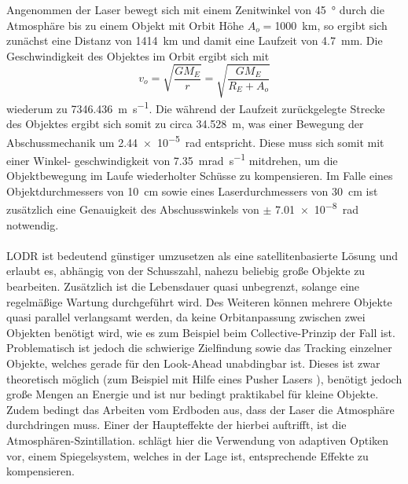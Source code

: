 \documentclass{article}
\begin{document}
Angenommen der Laser bewegt sich mit einem Zenitwinkel von \SI{45}{\degree} durch die Atmosphäre bis zu einem Objekt mit Orbit Höhe $A_o = $\SI{1000}{\kilo\meter}, so ergibt sich zunächst eine Distanz von \SI{1414}{\kilo\meter} und damit eine Laufzeit von \SI{4.7}{\milli \meter}. Die Geschwindigkeit des Objektes im Orbit ergibt sich mit 
\begin{equation}
	\label{objspeed}
	v_o=\sqrt{\frac{GM_E}{r}}=\sqrt{\frac{GM_E}{R_E+A_o}}
\end{equation}
\noindent
wiederum zu \SI{7346.436}{\meter \per \second}.
Die während der Laufzeit zurückgelegte Strecke des Objektes ergibt sich somit zu circa \SI{34.528}{\meter}, was einer Bewegung der Abschussmechanik um  \SI{2.44e-5}{\radian} entspricht. Diese muss sich somit mit einer Winkel- geschwindigkeit von \SI{7.35}{\milli \radian \per \second} mitdrehen, um die Objektbewegung im Laufe wiederholter Schüsse zu kompensieren. Im Falle eines Objektdurchmessers von \SI{10}{\centi \meter} sowie eines Laserdurchmessers von \SI{30}{\centi \meter} ist zusätzlich eine Genauigkeit des Abschusswinkels von $\pm$ \SI{7.01e-8}{\radian} notwendig.\\\\
LODR ist bedeutend günstiger umzusetzen als eine satellitenbasierte Lösung und erlaubt es, abhängig von der Schusszahl, nahezu beliebig große Objekte zu bearbeiten. Zusätzlich ist die Lebensdauer quasi unbegrenzt, solange eine regelmäßige Wartung durchgeführt wird. Des Weiteren können mehrere Objekte quasi parallel verlangsamt werden, da keine Orbitanpassung zwischen zwei Objekten benötigt wird, wie es zum Beispiel beim Collective-Prinzip der Fall ist. Problematisch ist jedoch die schwierige Zielfindung sowie das Tracking einzelner Objekte, welches gerade für den Look-Ahead unabdingbar ist. Dieses ist zwar theoretisch möglich (zum Beispiel mit Hilfe eines Pusher Lasers \citep{phipps1996orion}), benötigt jedoch große Mengen an Energie und ist nur bedingt praktikabel für kleine Objekte. Zudem bedingt das Arbeiten vom Erdboden aus, dass der Laser die Atmosphäre durchdringen muss. Einer der Haupteffekte der hierbei auftrifft, ist die Atmosphären-Szintillation. \citet{phipps1996orion} schlägt hier die Verwendung von adaptiven Optiken \citep{adptoptics} vor, einem Spiegelsystem, welches in der Lage ist, entsprechende Effekte zu kompensieren. 
\end{document}
